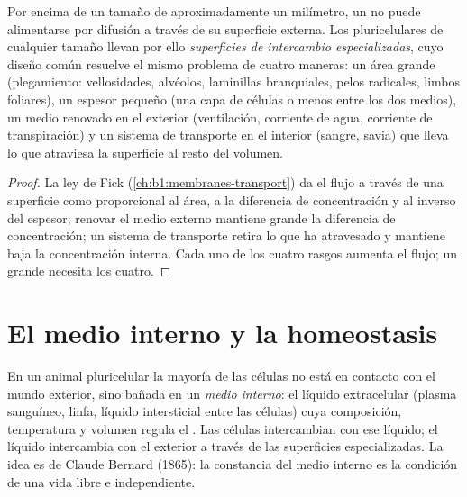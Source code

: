 \begin{proposition}\label{prop:b1:organism-environment:surfaces}
Por encima de un tamaño de aproximadamente un milímetro, un  no
puede alimentarse por difusión a través de su superficie externa. Los
 pluricelulares de cualquier tamaño llevan por ello
\emph{superficies de intercambio especializadas}, cuyo diseño común resuelve el mismo problema de cuatro maneras: un área
grande (plegamiento: vellosidades, alvéolos, laminillas branquiales, pelos
radicales, limbos foliares), un espesor pequeño (una capa de células o
menos entre los dos medios), un medio renovado en el exterior (ventilación,
corriente de agua, corriente de transpiración) y un sistema de transporte en
el interior (sangre, savia) que lleva lo que atraviesa la superficie al
resto del volumen.
\end{proposition}
\begin{proof}
La ley de Fick (\cref{ch:b1:membranes-transport}) da el flujo a través de una
superficie como proporcional al área, a la diferencia de concentración y al
inverso del espesor; renovar el medio externo mantiene grande la diferencia
de concentración; un sistema de transporte retira lo que ha atravesado y
mantiene baja la concentración interna. Cada uno de los cuatro rasgos
aumenta el flujo; un  grande necesita los cuatro.
\end{proof}

\section{El medio interno y la homeostasis}

\begin{definition}\label{def:b1:organism-environment:milieu}
En un animal pluricelular la mayoría de las células no está en contacto con
el mundo exterior, sino bañada en un \emph{medio interno}: el líquido extracelular (plasma sanguíneo, linfa, líquido
intersticial entre las células) cuya composición, temperatura y volumen
regula el . Las células intercambian con ese líquido; el líquido
intercambia con el exterior a través de las superficies especializadas. La
idea es de Claude Bernard (1865): la constancia del medio interno es la
condición de una vida libre e independiente.
\end{definition}

